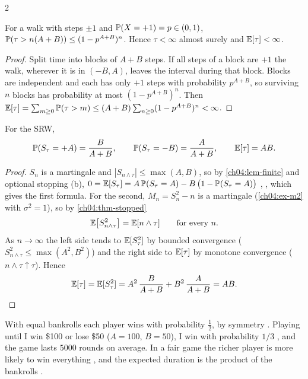 \begin{paracol}{2}
\begin{lemma}\label{ch04:lem-finite}
For a walk with steps $\pm1$ and $\mathbb{P}(X=+1)=p\in(0,1)$, $\mathbb{P}(\tau>n(A+B))\le(1-p^{A+B})^n$. Hence
$\tau<\infty$ almost surely and $\mathbb{E}[\tau]<\infty$.
\end{lemma}
\begin{proof}
Split time into blocks of $A+B$ steps. If all steps of a block are $+1$ the walk, wherever it is in $(-B,A)$,
leaves the interval during that block. Blocks are independent and each has only $+1$ steps with probability
$p^{A+B}$, so surviving $n$ blocks has probability at most $(1-p^{A+B})^n$. Then
$\mathbb{E}[\tau]=\sum_{m\ge0}\mathbb{P}(\tau>m)\le(A+B)\sum_{n\ge0}(1-p^{A+B})^n<\infty$.
\end{proof}

\begin{proposition}\label{ch04:prop-ruin}
For the SRW,
\[
  \mathbb{P}(S_\tau=+A)=\frac{B}{A+B},\qquad \mathbb{P}(S_\tau=-B)=\frac{A}{A+B},\qquad \mathbb{E}[\tau]=AB .
\]
\end{proposition}
\begin{proof}
$S_n$ is a martingale and $|S_{n\wedge\tau}|\le\max(A,B)$, so by \cref{ch04:lem-finite} and optional stopping (b),
$0=\mathbb{E}[S_\tau]=A\,\mathbb{P}(S_\tau=A)-B\,\bigl(1-\mathbb{P}(S_\tau=A)\bigr)$ , , which gives the
first formula. For the second, $M_n=S_n^2-n$ is a martingale (\cref{ch04:ex-m2} with $\sigma^2=1$), so by
\cref{ch04:thm-stopped}
\[
  \mathbb{E}\bigl[S_{n\wedge\tau}^2\bigr]=\mathbb{E}[n\wedge\tau]\qquad\text{for every }n.
\]
As $n\to\infty$ the left side tends to $\mathbb{E}[S_\tau^2]$ by bounded convergence ($S^2_{n\wedge\tau}\le\max(A^2,B^2)$) and the
right side to $\mathbb{E}[\tau]$ by monotone convergence ($n\wedge\tau\uparrow\tau$). Hence 
\[
  \mathbb{E}[\tau]=\mathbb{E}[S_\tau^2]=A^2\,\frac{B}{A+B}+B^2\,\frac{A}{A+B}=AB .\qedhere
\]
\end{proof}

With equal bankrolls each player wins with probability $\tfrac12$, by symmetry . Playing until I
win \$100 or lose \$50 ($A=100$, $B=50$), I win with probability $1/3$ , and the game lasts
$5000$ rounds on average. In a fair game the richer player is more likely to win everything
, and the expected duration is the product of the bankrolls .


\end{paracol}
